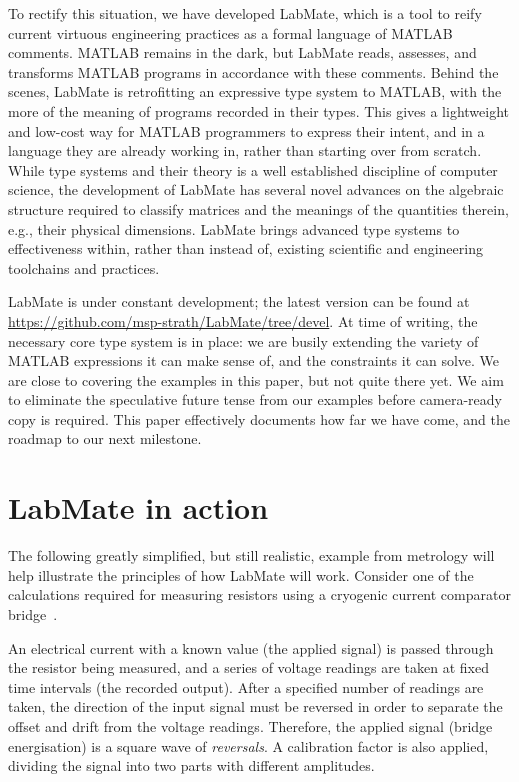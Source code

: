 \documentclass{IMEKO2024}
\begin{document}
To rectify this situation, we have developed LabMate, which is a tool
to reify current virtuous engineering practices as a formal language
of MATLAB comments. MATLAB remains in the dark, but LabMate reads,
assesses, and transforms MATLAB programs in accordance with these
comments.
%
Behind the scenes, LabMate is retrofitting an expressive type system
to MATLAB, with the more of the meaning of programs recorded in their
types.
%
This gives a lightweight and low-cost way for MATLAB programmers to
express their intent, and in a language they are already working in,
rather than starting over from scratch.
%
While type systems and their theory is a well established discipline
of computer science, the development of LabMate has several novel
advances on the algebraic structure required to classify
matrices and the meanings of the quantities therein, e.g., their
physical dimensions. LabMate brings advanced type systems to
effectiveness within, rather than instead of, existing scientific and
engineering toolchains and practices.

LabMate is under constant development; the latest version can be found at \url{https://github.com/msp-strath/LabMate/tree/devel}.
%
At time of writing, the necessary core type system is in place: we are busily extending the variety of MATLAB expressions it can make sense of, and the constraints it can solve.
%
We are close to covering the examples in this paper, but not quite there yet.
%
We aim to eliminate the speculative future tense from our examples before camera-ready copy is required.
%
This paper effectively documents how far we have come, and the roadmap to our next milestone.

\section{LabMate in action}
\label{sec:example}


The following greatly simplified, but still realistic, example from metrology  will help illustrate the principles of how LabMate will work. Consider one of the calculations required for measuring resistors using a cryogenic current comparator bridge~\cite{Williams_2010}.

An electrical current with a known value (the applied signal) is passed through the resistor being measured, and a series of voltage readings are taken at fixed time intervals (the recorded output). After a specified number of readings are taken, the direction of the input signal must be reversed in order to separate the offset and drift from the voltage readings. Therefore, the applied signal (bridge energisation) is a square wave of {\em reversals}. A calibration factor is also applied, dividing the signal into two parts with different amplitudes.
\end{document}
